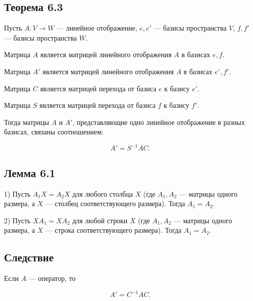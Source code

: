 {\subsection*{Теорема 6.3}

Пусть \( A : V \to W \) — линейное отображение, \( e, e' \) — базисы пространства \( V \), \( f, f' \) — базисы пространства \( W \).

Матрица \( A \) является матрицей линейного отображения \( A \) в базисах \( e, f \).

Матрица \( A' \) является матрицей линейного отображения \( A \) в базисах \( e', f' \).

Матрица \( C \) является матрицей перехода от базиса \( e \) к базису \( e' \).

Матрица \( S \) является матрицей перехода от базиса \( f \) к базису \( f' \).

Тогда матрицы \( A \) и \( A' \), представляющие одно линейное отображение в разных базисах, связаны соотношением:



\[
A' = S^{-1} A C.
\]



\subsection*{Лемма 6.1}

1) Пусть \( A_1 X = A_2 X \) для любого столбца \( X \) (где \( A_1, A_2 \) — матрицы одного размера, а \( X \) — столбец соответствующего размера). Тогда \( A_1 = A_2 \).

2) Пусть \( X A_1 = X A_2 \) для любой строки \( X \) (где \( A_1, A_2 \) — матрицы одного размера, а \( X \) — строка соответствующего размера). Тогда \( A_1 = A_2 \).

\subsection*{Следствие}

Если \( A \) — оператор, то 

\[
A' = C^{-1} A C.
\]
}
